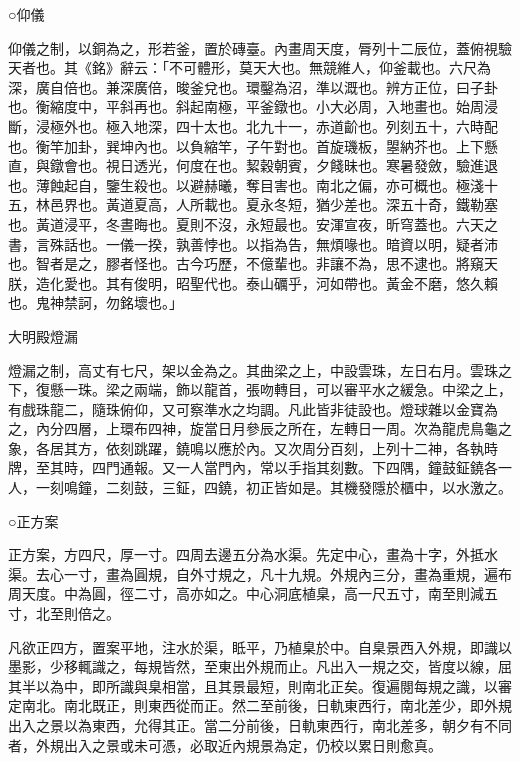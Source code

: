 \begin{pinyinscope}
 ○仰儀



 仰儀之制，以銅為之，形若釜，置於磚臺。內畫周天度，脣列十二辰位，蓋俯視驗天者也。其《銘》辭云：「不可體形，莫天大也。無競維人，仰釜載也。六尺為深，廣自倍也。兼深廣倍，晙釜兌也。環鑿為沼，準以溉也。辨方正位，曰子卦也。衡縮度中，平斜再也。斜起南極，平釜鐓也。小大必周，入地畫也。始周浸斷，浸極外也。極入地深，四十太也。北九十一，赤道齘也。列刻五十，六時配也。衡竿加卦，巽坤內也。以負縮竿，子午對也。首旋璣板，曌納芥也。上下懸直，與鐓會也。視日透光，何度在也。絜穀朝賓，夕餞昧也。寒暑發斂，驗進退也。薄蝕起自，鑒生殺也。以避赫曦，奪目害也。南北之偏，亦可概也。極淺十五，林邑界也。黃道夏高，人所載也。夏永冬短，猶少差也。深五十奇，鐵勒塞也。黃道浸平，冬晝晦也。夏則不沒，永短最也。安渾宣夜，昕穹蓋也。六天之書，言殊話也。一儀一揆，孰善悖也。以指為告，無煩喙也。暗資以明，疑者沛也。智者是之，膠者怪也。古今巧歷，不億輩也。非讓不為，思不逮也。將窺天朕，造化愛也。其有俊明，昭聖代也。泰山礪乎，河如帶也。黃金不磨，悠久賴也。鬼神禁訶，勿銘壞也。」



 大明殿燈漏



 燈漏之制，高丈有七尺，架以金為之。其曲梁之上，中設雲珠，左日右月。雲珠之下，復懸一珠。梁之兩端，飾以龍首，張吻轉目，可以審平水之緩急。中梁之上，有戲珠龍二，隨珠俯仰，又可察準水之均調。凡此皆非徒設也。燈球雜以金寶為之，內分四層，上環布四神，旋當日月參辰之所在，左轉日一周。次為龍虎鳥龜之象，各居其方，依刻跳躍，鐃鳴以應於內。又次周分百刻，上列十二神，各執時牌，至其時，四門通報。又一人當門內，常以手指其刻數。下四隅，鐘鼓鉦鐃各一人，一刻鳴鐘，二刻鼓，三鉦，四鐃，初正皆如是。其機發隱於櫃中，以水激之。



 ○正方案



 正方案，方四尺，厚一寸。四周去邊五分為水渠。先定中心，畫為十字，外抵水渠。去心一寸，畫為圓規，自外寸規之，凡十九規。外規內三分，畫為重規，遍布周天度。中為圓，徑二寸，高亦如之。中心洞底植臬，高一尺五寸，南至則減五寸，北至則倍之。



 凡欲正四方，置案平地，注水於渠，眡平，乃植臬於中。自臬景西入外規，即識以墨影，少移輒識之，每規皆然，至東出外規而止。凡出入一規之交，皆度以線，屈其半以為中，即所識與臬相當，且其景最短，則南北正矣。復遍閱每規之識，以審定南北。南北既正，則東西從而正。然二至前後，日軌東西行，南北差少，即外規出入之景以為東西，允得其正。當二分前後，日軌東西行，南北差多，朝夕有不同者，外規出入之景或未可憑，必取近內規景為定，仍校以累日則愈真。




\end{pinyinscope}

